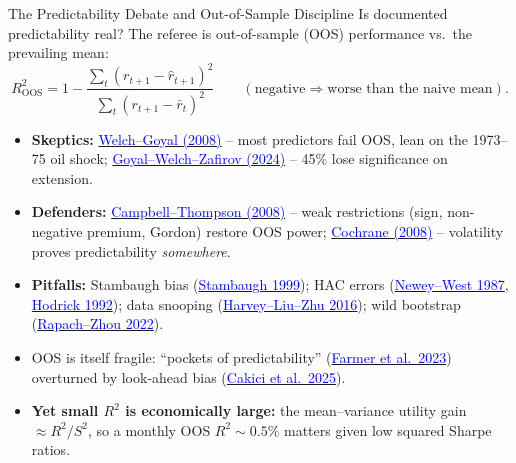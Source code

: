 \documentclass{beamer}
\begin{document}
\begin{frame}{The Predictability Debate and Out-of-Sample Discipline}
\small
Is documented predictability \alert{real}? The referee is out-of-sample (OOS) performance vs.\ the prevailing mean:
\begin{equation*}
  R^2_{\text{OOS}} = 1 - \frac{\sum_{t}(r_{t+1}-\hat r_{t+1})^2}{\sum_{t}(r_{t+1}-\bar r_{t})^2}
  \qquad (\text{negative} \Rightarrow \text{worse than the naive mean}).
\end{equation*}
\begin{itemize}
  \item \textbf{Skeptics:} \href{https://doi.org/10.1093/rfs/hhm014}{\textcolor{blue}{Welch--Goyal (2008)}} -- most predictors fail OOS, lean on the 1973--75 oil shock; \href{https://doi.org/10.1093/rfs/hhae044}{\textcolor{blue}{Goyal--Welch--Zafirov (2024)}} -- 45\% lose significance on extension.
  \item \textbf{Defenders:} \href{https://doi.org/10.1093/rfs/hhm055}{\textcolor{blue}{Campbell--Thompson (2008)}} -- weak restrictions (sign, non-negative premium, Gordon) restore OOS power; \href{https://doi.org/10.1093/rfs/hhm046}{\textcolor{blue}{Cochrane (2008)}} -- volatility proves predictability \textit{somewhere}.
  \item \textbf{Pitfalls:} Stambaugh bias (\href{https://doi.org/10.1016/S0304-405X(99)00041-0}{\textcolor{blue}{Stambaugh 1999}}); HAC errors (\href{https://doi.org/10.2307/1913610}{\textcolor{blue}{Newey--West 1987}}, \href{https://doi.org/10.1093/rfs/5.3.357}{\textcolor{blue}{Hodrick 1992}}); data snooping (\href{https://doi.org/10.1093/rfs/hhv059}{\textcolor{blue}{Harvey--Liu--Zhu 2016}}); wild bootstrap (\href{https://doi.org/10.1016/j.jfineco.2019.02.001}{\textcolor{blue}{Rapach--Zhou 2022}}).
  \item \alert{OOS is itself fragile:} ``pockets of predictability'' (\href{https://doi.org/10.1111/jofi.13229}{\textcolor{blue}{Farmer et al.\ 2023}}) overturned by look-ahead bias (\href{https://doi.org/10.1111/jofi.13484}{\textcolor{blue}{Cakici et al.\ 2025}}).
  \item \textbf{Yet small $R^2$ is economically large:} the mean--variance utility gain $\approx R^2/S^2$, so a monthly OOS $R^2\sim 0.5\%$ matters given low squared Sharpe ratios.
\end{itemize}
\end{frame}

\end{document}
